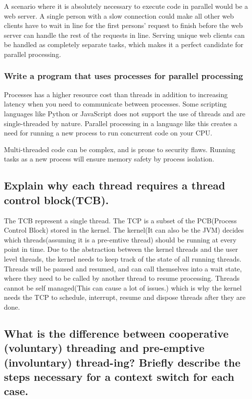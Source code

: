 \documentclass[a4paper]{article}
\begin{document}
A scenario where it is absolutely necessary to execute code in parallel would be a web server. A single person with a slow connection could make all other web clients have to wait in line for the first persons' request to finish before the web server can handle the rest of the requests in line. Serving unique web clients can be handled as completely separate tasks, which makes it a perfect candidate for parallel processing.

\subsubsection{Write a program that uses processes for parallel processing}

Processes has a higher resource cost than threads in addition to increasing latency when you need to communicate between processes. Some scripting languages like Python or JavaScript does not support the use of threads and are single-threaded by nature. Parallel processing in a language like this creates a need for running a new process to run concurrent code on your CPU. 

Multi-threaded code can be complex, and is prone to security flaws. Running tasks as a new process will ensure memory safety by process isolation.

\subsection{Explain why each thread requires a thread control block(TCB).}

The TCB represent a single thread. The TCP is a subset of the PCB(Process Control Block) stored in the kernel. The kernel(It can also be the JVM) decides which threads(assuming it is a pre-emtive thread) should be running at every point in time. Due to the abstraction between the kernel threads and the user level threads, the kernel needs to keep track of the state of all running threads. Threads will be paused and resumed, and can call themselves into a wait state, where they need to be called by another thread to resume processing. Threads cannot be self managed(This can cause a lot of issues.) which is why the kernel needs the TCP to schedule, interrupt, resume and dispose threads after they are done.

\subsection{What is the difference between cooperative (voluntary) threading and pre-emptive (involuntary) thread-ing?  Briefly describe the steps necessary for a context switch for each case.}
\end{document}
